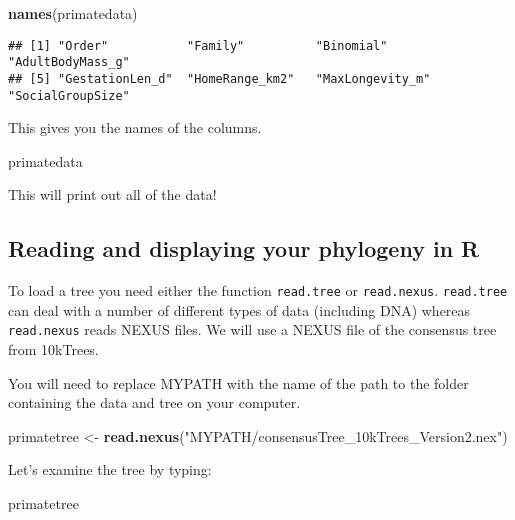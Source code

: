 \documentclass[11pt]{article}
\newcommand{\KeywordTok}[1]{\textcolor[rgb]{0.13,0.29,0.53}{\textbf{{#1}}}}
\newcommand{\StringTok}[1]{\textcolor[rgb]{0.31,0.60,0.02}{{#1}}}
\newcommand{\NormalTok}[1]{{#1}}
\begin{document}
\begin{snugshade}
\begin{Highlighting}[]
\KeywordTok{names}\NormalTok{(primatedata)}
\end{Highlighting}
\end{snugshade}

\begin{verbatim}
## [1] "Order"           "Family"          "Binomial"        "AdultBodyMass_g"
## [5] "GestationLen_d"  "HomeRange_km2"   "MaxLongevity_m"  "SocialGroupSize"
\end{verbatim}

This gives you the names of the columns.

\begin{snugshade}
\begin{Highlighting}[]
\NormalTok{primatedata}
\end{Highlighting}
\end{snugshade}

This will print out all of the data!

\subsection{Reading and displaying your phylogeny in R}

To load a tree you need either the function \texttt{read.tree} or \texttt{read.nexus}.
\texttt{read.tree} can deal with a number of different types of data (including
DNA) whereas \texttt{read.nexus} reads NEXUS files. We will use a NEXUS file of
the consensus tree from 10kTrees.

\begin{framed}
You will need to replace MYPATH with the name of the path to the folder containing the data and tree on your computer.
\end{framed}

\begin{snugshade}
\begin{Highlighting}[]
\NormalTok{primatetree <-}\StringTok{ }\KeywordTok{read.nexus}\NormalTok{(}\StringTok{"MYPATH/consensusTree_10kTrees_Version2.nex"}\NormalTok{)}
\end{Highlighting}
\end{snugshade}

Let's examine the tree by typing:

\begin{snugshade}
\begin{Highlighting}[]
\NormalTok{primatetree}
\end{Highlighting}
\end{snugshade}
\end{document}
